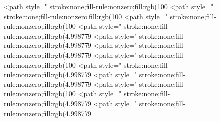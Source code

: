 <path style=" stroke:none;fill-rule:nonzero;fill:rgb(100%
<path style=" stroke:none;fill-rule:nonzero;fill:rgb(100%
<path style=" stroke:none;fill-rule:nonzero;fill:rgb(100%
<path style=" stroke:none;fill-rule:nonzero;fill:rgb(4.998779%
<path style=" stroke:none;fill-rule:nonzero;fill:rgb(4.998779%
<path style=" stroke:none;fill-rule:nonzero;fill:rgb(4.998779%
<path style=" stroke:none;fill-rule:nonzero;fill:rgb(100%
<path style=" stroke:none;fill-rule:nonzero;fill:rgb(4.998779%
<path style=" stroke:none;fill-rule:nonzero;fill:rgb(4.998779%
<path style=" stroke:none;fill-rule:nonzero;fill:rgb(100%
<path style=" stroke:none;fill-rule:nonzero;fill:rgb(4.998779%
<path style=" stroke:none;fill-rule:nonzero;fill:rgb(4.998779%
